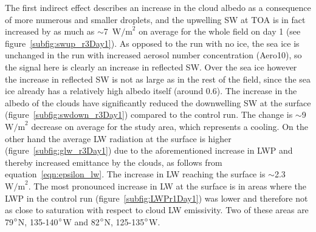 The first indirect effect describes an increase in the cloud albedo as a consequence of more numerous and smaller droplets, and the upwelling SW at TOA is in fact increased by as much as $\sim$7~$\text{W/m}^2$ on average for the whole field on day 1 (see figure~\ref{subfig:swup_r3Day1}). As opposed to the run with no ice, the sea ice is unchanged in the run with increased aerosol number concentration (Aero10), so the signal here is clearly an increase in reflected SW. Over the sea ice however the increase in reflected SW is not as large as in the rest of the field, since the sea ice already has a relatively high albedo itself (around 0.6). The increase in the albedo of the clouds have significantly reduced the downwelling SW at the surface (figure~\ref{subfig:swdown_r3Day1}) compared to the control run. The change is $\sim$9~$\text{W/m}^2$ decrease on average for the study area, which represents a cooling. On the other hand the average LW radiation at the surface is higher (figure~\ref{subfig:glw_r3Day1}) due to the aforementioned increase in LWP and thereby increased emittance by the clouds, as follows from equation~\ref{eqn:epsilon_lw}. The increase in LW reaching the surface is $\sim$2.3~$\text{W/m}^2$. The most pronounced increase in LW at the surface is in areas where the LWP in the control run (figure~\ref{subfig:LWPr1Day1}) was lower and therefore not as close to saturation with respect to cloud LW emissivity. Two of these areas are 79$\degree$N, 135-140$\degree$W and 82$\degree$N, 125-135$\degree$W. 

